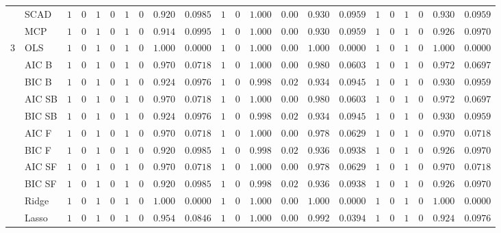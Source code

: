 \begin{tabular}{p{0.2cm}p{1cm}|p{0.6cm}p{0.6cm}|p{0.6cm}p{0.6cm}p{0.6cm}p{0.6cm}p{0.6cm}p{0.6cm}|p{0.6cm}p{0.6cm}p{0.6cm}p{0.6cm}p{0.6cm}p{0.6cm}|p{0.6cm}p{0.6cm}p{0.6cm}p{0.6cm}p{0.6cm}p{0.6cm}}
 & SCAD  & $1$ & $0$ & $1$ & $0$ & $1$ & $0$ & $0.920$ & $0.0985$ & $1$ & $0$ & $1.000$ & $0.00$ & $0.930$ & $0.0959$ & $1$ & $0$ & $1$ & $0$ & $0.930$ & $0.0959$ \\
 & MCP  & $1$ & $0$ & $1$ & $0$ & $1$ & $0$ & $0.914$ & $0.0995$ & $1$ & $0$ & $1.000$ & $0.00$ & $0.930$ & $0.0959$ & $1$ & $0$ & $1$ & $0$ & $0.926$ & $0.0970$ \\\hline
3 & OLS  & $1$ & $0$ & $1$ & $0$ & $1$ & $0$ & $1.000$ & $0.0000$ & $1$ & $0$ & $1.000$ & $0.00$ & $1.000$ & $0.0000$ & $1$ & $0$ & $1$ & $0$ & $1.000$ & $0.0000$ \\
 & AIC B  & $1$ & $0$ & $1$ & $0$ & $1$ & $0$ & $0.970$ & $0.0718$ & $1$ & $0$ & $1.000$ & $0.00$ & $0.980$ & $0.0603$ & $1$ & $0$ & $1$ & $0$ & $0.972$ & $0.0697$ \\
 & BIC B  & $1$ & $0$ & $1$ & $0$ & $1$ & $0$ & $0.924$ & $0.0976$ & $1$ & $0$ & $0.998$ & $0.02$ & $0.934$ & $0.0945$ & $1$ & $0$ & $1$ & $0$ & $0.930$ & $0.0959$ \\
 & AIC SB  & $1$ & $0$ & $1$ & $0$ & $1$ & $0$ & $0.970$ & $0.0718$ & $1$ & $0$ & $1.000$ & $0.00$ & $0.980$ & $0.0603$ & $1$ & $0$ & $1$ & $0$ & $0.972$ & $0.0697$ \\
 & BIC SB  & $1$ & $0$ & $1$ & $0$ & $1$ & $0$ & $0.924$ & $0.0976$ & $1$ & $0$ & $0.998$ & $0.02$ & $0.934$ & $0.0945$ & $1$ & $0$ & $1$ & $0$ & $0.930$ & $0.0959$ \\
 & AIC F  & $1$ & $0$ & $1$ & $0$ & $1$ & $0$ & $0.970$ & $0.0718$ & $1$ & $0$ & $1.000$ & $0.00$ & $0.978$ & $0.0629$ & $1$ & $0$ & $1$ & $0$ & $0.970$ & $0.0718$ \\
 & BIC F  & $1$ & $0$ & $1$ & $0$ & $1$ & $0$ & $0.920$ & $0.0985$ & $1$ & $0$ & $0.998$ & $0.02$ & $0.936$ & $0.0938$ & $1$ & $0$ & $1$ & $0$ & $0.926$ & $0.0970$ \\
 & AIC SF  & $1$ & $0$ & $1$ & $0$ & $1$ & $0$ & $0.970$ & $0.0718$ & $1$ & $0$ & $1.000$ & $0.00$ & $0.978$ & $0.0629$ & $1$ & $0$ & $1$ & $0$ & $0.970$ & $0.0718$ \\
 & BIC SF  & $1$ & $0$ & $1$ & $0$ & $1$ & $0$ & $0.920$ & $0.0985$ & $1$ & $0$ & $0.998$ & $0.02$ & $0.936$ & $0.0938$ & $1$ & $0$ & $1$ & $0$ & $0.926$ & $0.0970$ \\
 & Ridge  & $1$ & $0$ & $1$ & $0$ & $1$ & $0$ & $1.000$ & $0.0000$ & $1$ & $0$ & $1.000$ & $0.00$ & $1.000$ & $0.0000$ & $1$ & $0$ & $1$ & $0$ & $1.000$ & $0.0000$ \\
 & Lasso  & $1$ & $0$ & $1$ & $0$ & $1$ & $0$ & $0.954$ & $0.0846$ & $1$ & $0$ & $1.000$ & $0.00$ & $0.992$ & $0.0394$ & $1$ & $0$ & $1$ & $0$ & $0.924$ & $0.0976$ \\

\end{tabular}
